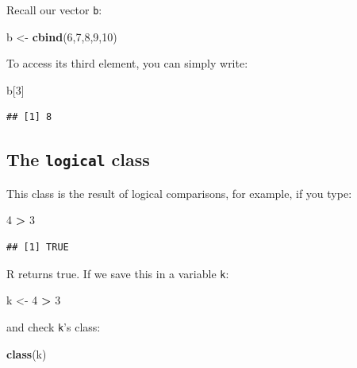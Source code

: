 \documentclass[]{gitbook}
\newenvironment{Shaded}{\begin{snugshade}}{\end{snugshade}}
\newcommand{\DecValTok}[1]{\textcolor[rgb]{0.00,0.00,0.81}{#1}}
\newcommand{\KeywordTok}[1]{\textcolor[rgb]{0.13,0.29,0.53}{\textbf{#1}}}
\newcommand{\NormalTok}[1]{#1}
\newcommand{\OperatorTok}[1]{\textcolor[rgb]{0.81,0.36,0.00}{\textbf{#1}}}
\newcommand{\StringTok}[1]{\textcolor[rgb]{0.31,0.60,0.02}{#1}}
\theoremstyle{definition}
\theoremstyle{definition}
\theoremstyle{definition}
\theoremstyle{remark}
\begin{document}
Recall our vector \texttt{b}:

\begin{Shaded}
\begin{Highlighting}[]
\NormalTok{b <-}\StringTok{ }\KeywordTok{cbind}\NormalTok{(}\DecValTok{6}\NormalTok{,}\DecValTok{7}\NormalTok{,}\DecValTok{8}\NormalTok{,}\DecValTok{9}\NormalTok{,}\DecValTok{10}\NormalTok{)}
\end{Highlighting}
\end{Shaded}

To access its third element, you can simply write:

\begin{Shaded}
\begin{Highlighting}[]
\NormalTok{b[}\DecValTok{3}\NormalTok{]}
\end{Highlighting}
\end{Shaded}

\begin{verbatim}
## [1] 8
\end{verbatim}

\hypertarget{the-logical-class}{%
\subsection{\texorpdfstring{The \texttt{logical}
class}{The logical class}}\label{the-logical-class}}

This class is the result of logical comparisons, for example, if you
type:

\begin{Shaded}
\begin{Highlighting}[]
\DecValTok{4} \OperatorTok{>}\StringTok{ }\DecValTok{3}
\end{Highlighting}
\end{Shaded}

\begin{verbatim}
## [1] TRUE
\end{verbatim}

R returns true. If we save this in a variable \texttt{k}:

\begin{Shaded}
\begin{Highlighting}[]
\NormalTok{k <-}\StringTok{ }\DecValTok{4} \OperatorTok{>}\StringTok{ }\DecValTok{3}
\end{Highlighting}
\end{Shaded}

and check \texttt{k}'s class:

\begin{Shaded}
\begin{Highlighting}[]
\KeywordTok{class}\NormalTok{(k)}
\end{Highlighting}
\end{Shaded}
\end{document}
